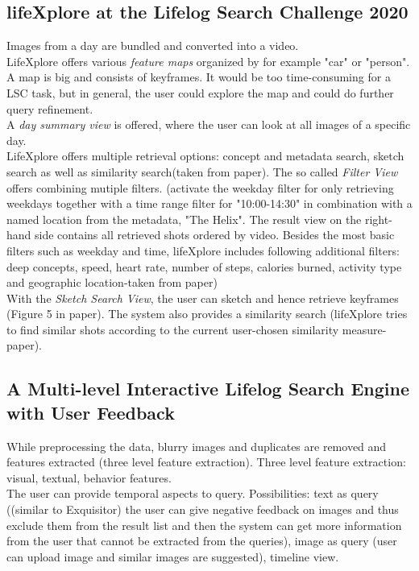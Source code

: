 \subsection{lifeXplore at the Lifelog Search Challenge 2020}
Images from a day are bundled and converted into a video.\\
LifeXplore offers various \textit{feature maps} organized by for example "car" or "person". A map is big and consists of keyframes. It would be too time-consuming for a LSC task, but in general, the user could explore the map and could do further query refinement.\\
A \textit{day summary view} is offered, where the user can look at all images of a specific day.\\

LifeXplore offers multiple retrieval options: concept and metadata search, sketch search as well as similarity search(taken from paper). 
The so called \textit{Filter View} offers combining mutiple filters. (activate the weekday filter for only retrieving weekdays together with a time range filter for "10:00-14:30" in combination with a named location from the metadata, "The Helix". The result view on the right-hand side contains all retrieved shots ordered by video. Besides the most basic filters such as weekday and time, lifeXplore includes following additional filters: deep concepts, speed, heart rate, number of steps, calories burned, activity type and geographic location-taken from paper)\\

With the \textit{Sketch Search View}, the user can sketch and hence retrieve keyframes (Figure 5 in paper). The system also provides a similarity search (lifeXplore tries to find similar shots according to the current user-chosen similarity measure-paper).

\subsection{A Multi-level Interactive Lifelog Search Engine with User Feedback}
While preprocessing the data, blurry images and duplicates are removed and features extracted (three level feature extraction).
Three level feature extraction: visual, textual, behavior features.\\
The user can provide temporal aspects to query. Possibilities: text as query ((similar to Exquisitor) the user can give negative feedback on images and thus exclude them from the result list and then the system can get more information from the user that cannot be extracted from the queries), image as query (user can upload image and similar images are suggested), timeline view. 


